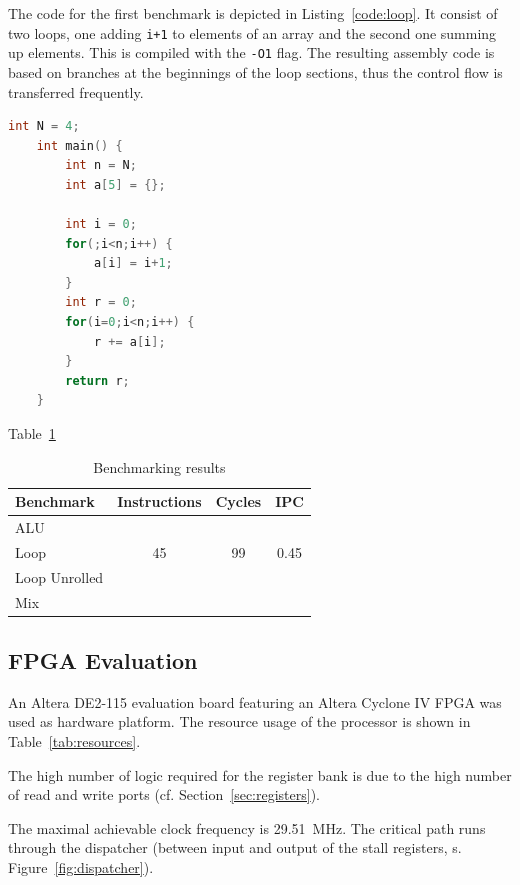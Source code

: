 \documentclass[conference]{IEEEtran}
\begin{document}
The code for the first benchmark is depicted in Listing~\ref{code:loop}. It consist of two loops, one adding \verb|i+1| to elements of an array and the second one summing up elements. This is compiled with the \verb|-O1| flag. The resulting assembly code is based on branches at the beginnings of the loop sections, thus the control flow is transferred frequently.

\begin{lstlisting}[language=C, caption=Code for the loop benchmark, label=code:loop]
	int N = 4;
	int main() {
		int n = N;
		int a[5] = {};

		int i = 0;
		for(;i<n;i++) {
			a[i] = i+1;
		}
		int r = 0;
		for(i=0;i<n;i++) {
			r += a[i];
		}
		return r;
	}
\end{lstlisting}





Table~\ref{tab:results}

\begin{table} [h]
	\caption{Benchmarking results}
	\centering
	\begin{tabular}{l c c c}
			Benchmark & Instructions & Cycles & IPC \\
		\midrule
			ALU & & & \\
			Loop & 45 & 99 & 0.45 \\
			Loop Unrolled & & & \\
			Mix & & & 
	\end{tabular}
	\label{tab:results}
\end{table}



\subsection{FPGA Evaluation}

An Altera DE2-115 evaluation board featuring an Altera Cyclone IV FPGA was used as hardware platform. The resource usage of the processor is shown in Table~\ref{tab:resources}. %

The high number of logic required for the register bank is due to the high number of read and write ports (cf. Section~\ref{sec:registers}).

The maximal achievable clock frequency is \SI{29.51}{\MHz}. The critical path runs through the dispatcher (between input and output of the stall registers, s. Figure~\ref{fig:dispatcher}). %
\end{document}
